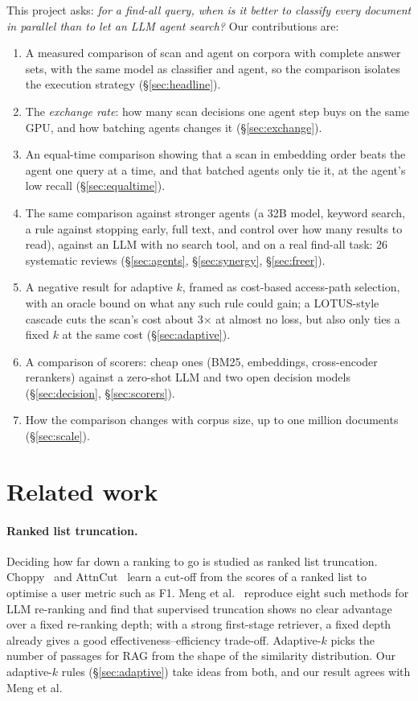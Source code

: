 \documentclass[11pt]{article}
\begin{document}
This project asks: \emph{for a find-all query, when is it better to classify
every document in parallel than to let an LLM agent search?} Our
contributions are:
\begin{enumerate}
  \item A measured comparison of scan and agent on corpora with complete
  answer sets, with the same model as classifier and agent, so the
  comparison isolates the execution strategy (\S\ref{sec:headline}).
  \item The \emph{exchange rate}: how many scan decisions one agent step buys
  on the same GPU, and how batching agents changes it
  (\S\ref{sec:exchange}).
  \item An equal-time comparison showing that a scan in embedding order beats
  the agent one query at a time, and that batched agents only tie it, at the
  agent's low recall (\S\ref{sec:equaltime}).
  \item The same comparison against stronger agents (a 32B model, keyword
  search, a rule against stopping early, full text, and control over how many
  results to read), against an LLM with no search tool, and on a real find-all
  task: 26 systematic reviews (\S\ref{sec:agents}, \S\ref{sec:synergy},
  \S\ref{sec:freer}).
  \item A negative result for adaptive $k$, framed as cost-based access-path
  selection, with an oracle bound on what any such rule could gain; a
  LOTUS-style cascade cuts the scan's cost about 3$\times$ at almost no loss,
  but also only ties a fixed $k$ at the same cost (\S\ref{sec:adaptive}).
  \item A comparison of scorers: cheap ones (BM25, embeddings, cross-encoder
  rerankers) against a zero-shot LLM and two open decision models
  (\S\ref{sec:decision}, \S\ref{sec:scorers}).
  \item How the comparison changes with corpus size, up to one million
  documents (\S\ref{sec:scale}).
\end{enumerate}

\section{Related work}

\paragraph{Ranked list truncation.}
Deciding how far down a ranking to go is studied as ranked list truncation.
Choppy~\cite{bahri2020choppy} and AttnCut~\cite{wu2021attncut} learn a cut-off
from the scores of a ranked list to optimise a user metric such as F1. Meng
et al.~\cite{meng2024rlt} reproduce eight such methods for LLM re-ranking and
find that supervised truncation shows no clear advantage over a fixed
re-ranking depth; with a strong first-stage retriever, a fixed depth already
gives a good effectiveness--efficiency trade-off. Adaptive-$k$
\cite{taguchi2025adaptivek} picks the number of passages for RAG from the
shape of the similarity distribution. Our adaptive-$k$ rules
(\S\ref{sec:adaptive}) take ideas from both, and our result agrees with Meng
et al.
\end{document}
